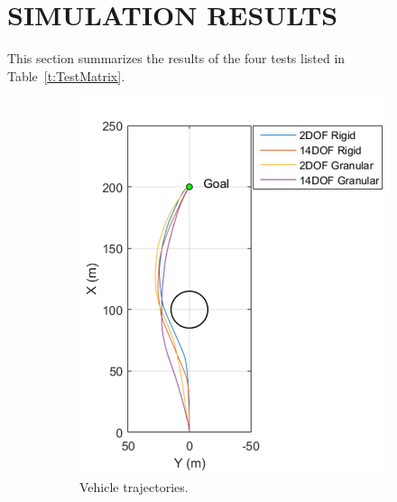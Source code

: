 \documentclass[12pt,twocolumn]{article}
\begin{document}

\section{SIMULATION RESULTS}\label{s:results}

This section summarizes the results of the four tests listed in Table~\ref{t:TestMatrix}. 

\begin{figure}
	\centering
	\begin{subfigure}[b]{\columnwidth}
		\centering
		\includegraphics[height=\columnwidth]{Figs/ObstacleField1Trajectories.png}
		\caption{{\small Vehicle trajectories.}}   
		\label{fig:ObstacleField1Trajectories}
	\end{subfigure}
	\hfill
	\begin{subfigure}[b]{\columnwidth}
		\centering

\end{subfigure}
\end{figure}
\end{document}
